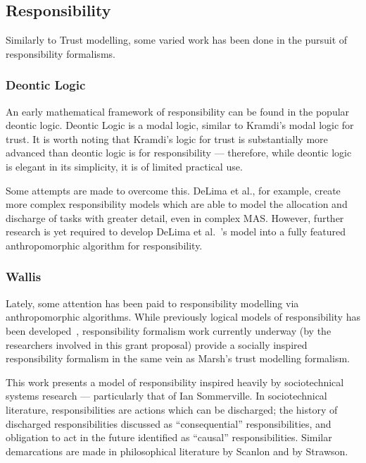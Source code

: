 \subsection{Responsibility}
Similarly to Trust modelling, some varied work has been done in the pursuit of responsibility formalisms.

\subsubsection*{Deontic Logic}

An early mathematical framework of responsibility can be found in the popular deontic logic\cite{deontic-logic}. Deontic Logic is a modal logic, similar to Kramdi's modal logic for trust.\cite{kramdi} It is worth noting that Kramdi's logic for trust is substantially more advanced than deontic logic is for responsibility --- therefore, while deontic logic is elegant in its simplicity, it is of limited practical use.\par

Some attempts are made to overcome this. DeLima et al., for example, create more complex responsibility models which are able to model the allocation and discharge of tasks with greater detail, even in complex MAS.\cite{DeLima2008} However, further research is yet required to develop DeLima et al.~'s model into a fully featured anthropomorphic algorithm for responsibility.

\subsubsection*{Wallis}
Lately, some attention has been paid to responsibility modelling via anthropomorphic algorithms.\cite{wallis2017} While previously logical models of responsibility has been developed~\cite{berreby2015modelling}, responsibility formalism work currently underway (by the researchers involved in this grant proposal) provide a socially inspired responsibility formalism in the same vein as Marsh's trust modelling formalism.\par

This work presents a model of responsibility inspired heavily by sociotechnical systems research --- particularly that of Ian Sommerville\cite{Sommerville:2007ec}. In sociotechnical literature, responsibilities are actions which can be discharged; the history of discharged responsibilities discussed as ``consequential'' responsibilities, and obligation to act in the future identified as ``causal'' responsibilities. Similar demarcations are made in philosophical literature by Scanlon\cite{scanlon2006justice} and by Strawson\cite{strawson}.\par

